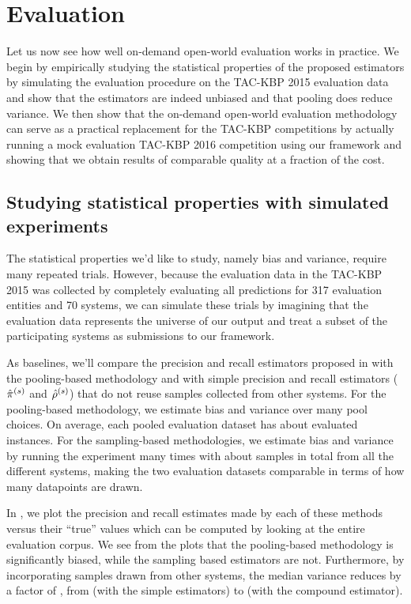 \section{Evaluation}
\label{sec:evaluation}

Let us now see how well on-demand open-world evaluation works in practice.
We begin by empirically studying the statistical properties of the proposed estimators by simulating the evaluation procedure on the TAC-KBP 2015 evaluation data and show that the estimators are indeed unbiased and that pooling does reduce variance.
We then show that the on-demand open-world evaluation methodology can serve as a practical replacement for the TAC-KBP competitions by actually running a mock evaluation TAC-KBP 2016 competition using our framework and showing that we obtain results of comparable quality at a fraction of the cost.

\subsection{Studying statistical properties with simulated experiments}
The statistical properties we'd like to study, namely bias and variance, require many repeated trials.
However, because the evaluation data in the TAC-KBP 2015 was collected by completely evaluating all predictions for 317 evaluation entities and 70 systems, we can simulate these trials by imagining that the evaluation data represents the universe of our output and treat a subset of the participating systems as submissions to our framework.

As baselines, we'll compare the precision and recall estimators proposed in  with the pooling-based methodology and with simple precision and recall estimators (${\hat{\pi}}^{(s)}$ and ${\hat{\rho}}^{(s)}$) that do not reuse samples collected from other systems.
For the pooling-based methodology, we estimate bias and variance over many pool choices.
  On average, each pooled evaluation dataset has about  evaluated instances.
For the sampling-based methodologies, we estimate bias and variance by running the experiment many times with about  samples in total from all the different systems, making the two evaluation datasets comparable in terms of how many datapoints are drawn.

In , we plot the precision and recall estimates made by each of these methods versus their ``true'' values which can be computed by looking at the entire evaluation corpus.
We see from the plots that the pooling-based methodology is significantly biased, while the sampling based estimators are not.
Furthermore, by incorporating samples drawn from other systems, the median variance reduces by a factor of , from  (with the simple estimators) to  (with the compound estimator).

